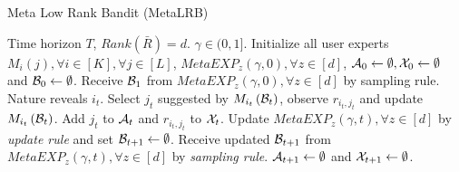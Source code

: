 %
%
%
%
%



\begin{algorithm}[!th]
\caption{Meta Low Rank Bandit (MetaLRB)}
\label{alg:mLRB}
\begin{algorithmic}[1]
 Time horizon $T$, $Rank(\bar{R}) = d$.
 $\gamma \in (0,1]$.
 Initialize all user experts $M_{i}\left( j\right), \forall i\in [K], \forall j\in [L]$,  $MetaEXP_{z}(\gamma, 0),\forall z\in[d]$, $\mathcal{A}_0 \leftarrow \emptyset, \mathcal{X}_0\leftarrow  \emptyset$ and $\mathcal{B}_0\leftarrow \emptyset$.
\State Receive $\mathcal{B}_1$ from $MetaEXP_z(\gamma, 0),\forall z\in[d]$ by sampling rule.
\State Nature reveals $i_t$.  
\State Select $j_t$ suggested by $M_{i_t}\left( \mathcal{B}_t \right)$, observe $r_{i_t,j_t}$ and update $M_{i_t}\left( \mathcal{B}_t \right)$. 
\State Add $j_t$ to $\mathcal{A}_t$ and $r_{i_t,j_t}$ to $\mathcal{X}_t$.
 
\State Update $MetaEXP_{z}(\gamma, t),\forall z\in[d]$ by \textit{update rule} and set $\mathcal{B}_{t+1}\leftarrow\emptyset$.
\State Receive updated $\mathcal{B}_{t+1}$ from $MetaEXP_z(\gamma, t),\forall z\in[d]$ by \textit{sampling rule}.
\State $\mathcal{A}_{t+1}\leftarrow\emptyset$ and $\mathcal{X}_{t+1}\leftarrow\emptyset$.
\EndIf
\EndFor
\end{algorithmic}
\end{algorithm}


